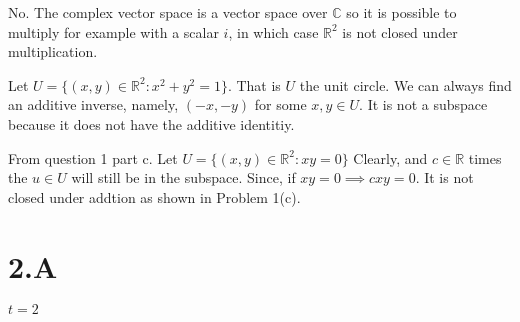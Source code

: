 \documentclass[10pt, twocolumn]{article}
\newcommand{\C}{\mathbb{C}}
\newcommand{\R}{\mathbb{R}}
\begin{document}
\begin{q}[Problem 5]
    No. The complex vector space is a vector space over $ \C $ so it is possible to multiply for example with a scalar $ i $, 
    in which case $ \R^2 $ is not closed under multiplication.
\end{q}
\begin{q}[Problem 7]
    Let $ U = \{(x, y) \in \R^2 : x^2 + y^2 = 1\} $. That is $ U $ the unit circle. 
    We can always find an additive inverse, namely, $(-x, -y)$ for some $ x, y \in U $. 
    It is not a subspace because it does not have the additive identitiy.
\end{q}
\begin{q}[Problem 8]
    From question 1 part c. 
    Let $U =\{(x, y) \in \R^2 : xy = 0\} $
    Clearly, and $ c \in \R $ times the $ u \in U $ will still be in the subspace. Since, if $ xy = 0 \implies cxy = 0 $. 
    It is not closed under addtion as shown in Problem 1(c).
\end{q}

\section*{2.A}
\begin{q}[Problem 3]
    $ t = 2 $
\end{q}
\end{document}
